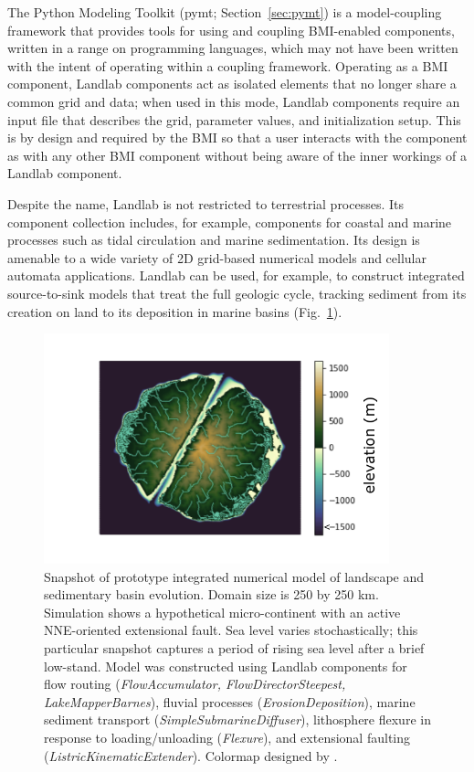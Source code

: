 \documentclass[journal abbreviation, manuscript]{copernicus}
\begin{document}
The Python Modeling Toolkit (pymt; Section~\ref{sec:pymt})
is a model-coupling framework that provides tools for using and coupling BMI-enabled components,
written in a range on programming languages, which may not have been written with the intent
of operating within a coupling framework.
Operating as a BMI component, Landlab components act as isolated elements that no longer
share a common grid and data; when used in this mode, Landlab components require an input file that describes the grid, parameter values, and
initialization setup. This is by design and required by the BMI so that a user interacts
with the component as with any other BMI component without being aware of the inner workings
of a Landlab component.


Despite the name, Landlab is not restricted to terrestrial processes. Its component collection includes, for example, components for coastal and marine processes such as tidal circulation and marine sedimentation. Its design is amenable to a wide variety of 2D grid-based numerical models and cellular automata applications. Landlab can be used, for example, to construct integrated source-to-sink models that treat the full geologic cycle, tracking sediment from its creation on land to its deposition in marine basins (Fig.~\ref{fig:riftisland}).

\begin{figure}
\includegraphics[width=10cm]{Figures/fig12.pdf}
\caption{Snapshot of prototype integrated numerical model of landscape and sedimentary basin evolution. Domain size is 250 by 250 km. Simulation shows a hypothetical micro-continent with an active NNE-oriented extensional fault. Sea level varies stochastically; this particular snapshot captures a period of rising sea level after a brief low-stand. Model was constructed using Landlab components for flow routing (\textit{FlowAccumulator, FlowDirectorSteepest, LakeMapperBarnes}), fluvial processes (\textit{ErosionDeposition}), marine sediment transport (\textit{SimpleSubmarineDiffuser}), lithosphere flexure in response to loading/unloading (\textit{Flexure}), and extensional faulting (\textit{ListricKinematicExtender}). Colormap designed by \citet{thyng2016true}.}
\label{fig:riftisland}
\end{figure}
\end{document}
